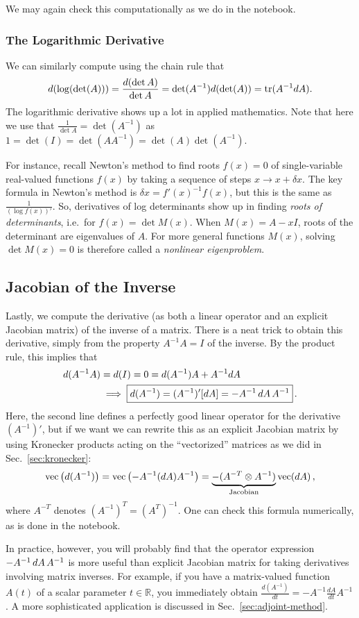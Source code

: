 We may again check this computationally as we do in the notebook.

\subsubsection{The Logarithmic Derivative}

We can similarly compute using the chain rule that 
\[
d (\log (\det (A))) = \frac{d (\det A)}{ \det A} = \det (A^{-1}) d (\det (A)) = \operatorname{tr}(A^{-1} d A).
\]
The logarithmic derivative shows up a lot in applied mathematics. Note that here we use that $\frac{1}{\det A} = \det(A^{-1})$ as $1 = \det(I) = \det(AA^{-1}) = \det (A) \det(A^{-1}).$

For instance, recall Newton's method to find roots $f(x)=0$ of single-variable real-valued functions $f(x)$ by taking a sequence of steps $x \to x + \delta x$.  The key formula in Newton's method is $\delta x = f'(x)^{-1}f(x)$, but this is the same as $\frac{1}{(\log f(x))'}$. So, derivatives of log determinants show up in finding \emph{roots of determinants}, i.e.~for $f(x) = \det M(x)$.  When $M(x) = A - x I$, roots of the determinant are eigenvalues of $A$.  For more general functions $M(x)$, solving $\det M(x) = 0$ is therefore called a \emph{nonlinear eigenproblem}.

\subsection{Jacobian of the Inverse}
\label{sec:jacobian-inverse}

Lastly, we compute the derivative (as both a linear operator and an explicit Jacobian matrix) of the inverse of a matrix. There is a neat trick to obtain this derivative, simply from the property $A^{-1}A = I$ of the inverse.  By the product rule, this implies that
\begin{align*}
d (A^{-1} A) &= d(I) = 0 = d (A^{-1}) A + A^{-1} d A \\
& \implies \boxed{d (A^{-1}) = (A^{-1})'[dA] = - A^{-1} \, d A \, A^{-1} }\, .
\end{align*}
Here, the second line defines a perfectly good linear operator for the derivative $(A^{-1})'$, but if we want we can rewrite this as an explicit Jacobian matrix by using Kronecker products acting on the ``vectorized'' matrices as we did in Sec.~\ref{sec:kronecker}:
\[
\operatorname{vec}\left(d (A^{-1})\right) = \operatorname{vec}\left(-A^{-1} (d A) A^{-1}\right) = \underbrace{- (A^{-T} \otimes A^{-1})}_\mathrm{Jacobian} \operatorname{vec}(d A) \, ,
\]
where $A^{-T}$ denotes $(A^{-1})^T = (A^T)^{-1}$.
One can check this formula numerically, as is done in the notebook.

In practice, however, you will probably find that the operator expression $- A^{-1} \, d A \, A^{-1}$ is more useful than explicit Jacobian matrix for taking derivatives involving matrix inverses.  For example, if you have a matrix-valued function $A(t)$ of a scalar parameter $t \in \mathbb{R}$, you immediately obtain $\frac{d(A^{-1})}{dt} = -A^{-1} \frac{dA}{dt} A^{-1}$.   A more sophisticated application is discussed in Sec.~\ref{sec:adjoint-method}.